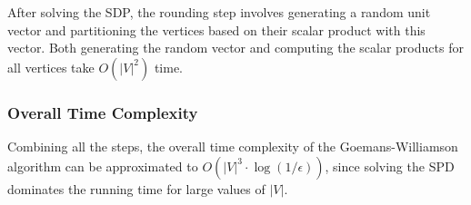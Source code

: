 After solving the SDP, the rounding step involves generating a random unit vector and partitioning the vertices based on their scalar product with this vector. Both generating the random vector and computing the scalar products for all vertices take \(O(|V|^2)\) time.

\subsubsection{Overall Time Complexity}

Combining all the steps, the overall time complexity of the Goemans-Williamson algorithm can be approximated to \(O(|V|^3 \cdot \log(1/\epsilon))\), since solving the SPD dominates the running time for large values of \(|V|\).